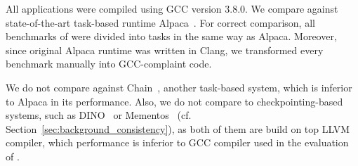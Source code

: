 All applications were compiled using GCC version 3.8.0.  We compare \sys against state-of-the-art task-based runtime Alpaca~\cite{alpaca}. For correct comparison, all benchmarks of \sys were divided into tasks in the same way as Alpaca. Moreover, since original Alpaca runtime was written in Clang, we transformed every benchmark manually into GCC-complaint code. 

We do not compare \sys against Chain~\cite{chain}, another task-based system, which is inferior to Alpaca in its performance. Also, we do not compare \sys to checkpointing-based systems, such as DINO~\cite{dino} or Mementos~\cite{mementos} (cf. Section~\ref{sec:background_consistency}), as both of them are build on top LLVM compiler, which performance is inferior to GCC compiler used in the evaluation of \sys {}.